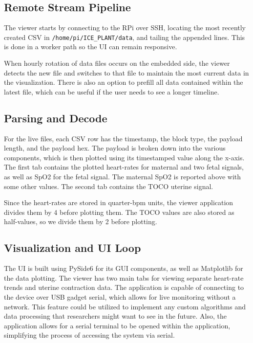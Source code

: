 \documentclass[11pt]{article}
\begin{document}
\subsection*{Remote Stream Pipeline}
The viewer starts by connecting to the RPi over SSH, locating the most recently created CSV in \texttt{/home/pi/ICE\_PLANT/data}, and tailing the appended lines. This is done in a worker path so the UI can remain responsive.

When hourly rotation of data files occurs on the embedded side, the viewer detects the new file and switches to that file to maintain the most current data in the visualization. There is also an option to prefill all data contained within the latest file, which can be useful if the user needs to see a longer timeline.

\subsection*{Parsing and Decode}
For the live files, each CSV row has the timestamp, the block type, the payload length, and the payload hex. The payload is broken down into the various components, which is then plotted using its timestamped value along the x-axis. The first tab contains the plotted heart-rates for maternal and two fetal signals, as well as SpO2 for the fetal signal. The maternal SpO2 is reported above with some other values. The second tab contains the TOCO uterine signal.

Since the heart-rates are stored in quarter-bpm units, the viewer application divides them by 4 before plotting them. The TOCO values are also stored as half-values, so we divide them by 2 before plotting.

\subsection*{Visualization and UI Loop}
The UI is built using PySide6 for its GUI components, as well as Matplotlib for the data plotting. The viewer has two main tabs for viewing separate heart-rate trends and uterine contraction data. The application is capable of connecting to the device over USB gadget serial, which allows for live monitoring without a network. This feature could be utilized to implement any custom algorithms and data processing that researchers might want to see in the future. Also, the application allows for a serial terminal to be opened within the application, simplifying the process of accessing the system via serial. 
\end{document}
